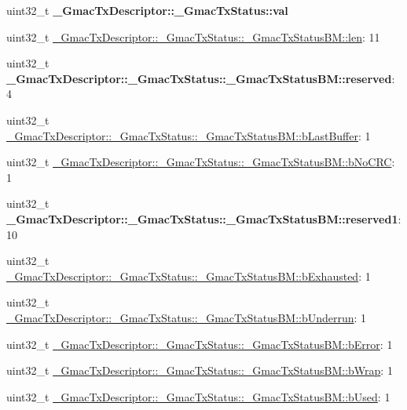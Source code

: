 \begin{DoxyCompactItemize}
uint32\+\_\+t {\bfseries \+\_\+\+Gmac\+Tx\+Descriptor\+::\+\_\+\+Gmac\+Tx\+Status\+::val}
\item 
uint32\+\_\+t \mbox{\hyperlink{group__gmac__defines_ga6f063648185454976ccc09200fc406b3}{\+\_\+\+Gmac\+Tx\+Descriptor\+::\+\_\+\+Gmac\+Tx\+Status\+::\+\_\+\+Gmac\+Tx\+Status\+B\+M\+::len}}\+: 11
\item 
\mbox{\label{group__gmac__defines_gae0c98afaa21acb7d818865d9fe52733f}} 
uint32\+\_\+t {\bfseries \+\_\+\+Gmac\+Tx\+Descriptor\+::\+\_\+\+Gmac\+Tx\+Status\+::\+\_\+\+Gmac\+Tx\+Status\+B\+M\+::reserved}\+: 4
\item 
uint32\+\_\+t \mbox{\hyperlink{group__gmac__defines_ga419cfc782ef1af2872c41d020cb17be7}{\+\_\+\+Gmac\+Tx\+Descriptor\+::\+\_\+\+Gmac\+Tx\+Status\+::\+\_\+\+Gmac\+Tx\+Status\+B\+M\+::b\+Last\+Buffer}}\+: 1
\item 
uint32\+\_\+t \mbox{\hyperlink{group__gmac__defines_ga5f287c86c213afb8d007d7e15b4c0390}{\+\_\+\+Gmac\+Tx\+Descriptor\+::\+\_\+\+Gmac\+Tx\+Status\+::\+\_\+\+Gmac\+Tx\+Status\+B\+M\+::b\+No\+C\+RC}}\+: 1
\item 
\mbox{\label{group__gmac__defines_gaee19eb4b53b6d86e7b931d855b207c90}} 
uint32\+\_\+t {\bfseries \+\_\+\+Gmac\+Tx\+Descriptor\+::\+\_\+\+Gmac\+Tx\+Status\+::\+\_\+\+Gmac\+Tx\+Status\+B\+M\+::reserved1}\+: 10
\item 
uint32\+\_\+t \mbox{\hyperlink{group__gmac__defines_ga8b6d4be62bda193039d76cd152783867}{\+\_\+\+Gmac\+Tx\+Descriptor\+::\+\_\+\+Gmac\+Tx\+Status\+::\+\_\+\+Gmac\+Tx\+Status\+B\+M\+::b\+Exhausted}}\+: 1
\item 
uint32\+\_\+t \mbox{\hyperlink{group__gmac__defines_ga149c144aad6f6ba23b14b250a3570ff5}{\+\_\+\+Gmac\+Tx\+Descriptor\+::\+\_\+\+Gmac\+Tx\+Status\+::\+\_\+\+Gmac\+Tx\+Status\+B\+M\+::b\+Underrun}}\+: 1
\item 
uint32\+\_\+t \mbox{\hyperlink{group__gmac__defines_gaa5e63eab363bc1c8cc93079e89b85b02}{\+\_\+\+Gmac\+Tx\+Descriptor\+::\+\_\+\+Gmac\+Tx\+Status\+::\+\_\+\+Gmac\+Tx\+Status\+B\+M\+::b\+Error}}\+: 1
\item 
uint32\+\_\+t \mbox{\hyperlink{group__gmac__defines_ga9f84a7eadddc254a2b72d64891fb5cc6}{\+\_\+\+Gmac\+Tx\+Descriptor\+::\+\_\+\+Gmac\+Tx\+Status\+::\+\_\+\+Gmac\+Tx\+Status\+B\+M\+::b\+Wrap}}\+: 1
\item 
uint32\+\_\+t \mbox{\hyperlink{group__gmac__defines_gaf315ceadedbf98decc5af7f1e685fd8b}{\+\_\+\+Gmac\+Tx\+Descriptor\+::\+\_\+\+Gmac\+Tx\+Status\+::\+\_\+\+Gmac\+Tx\+Status\+B\+M\+::b\+Used}}\+: 1

\end{DoxyCompactItemize}
